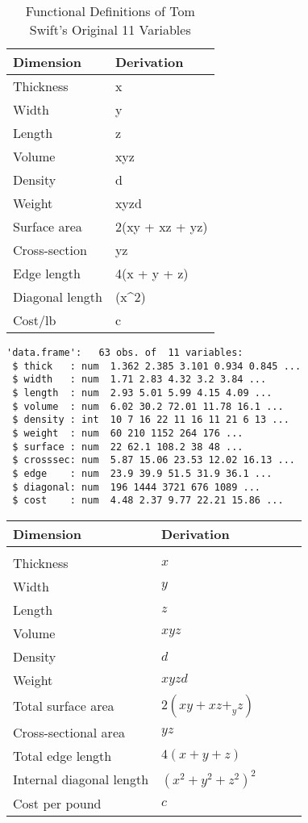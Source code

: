 \documentclass[
]{book}
\begin{document}
\begin{table}

\caption{\label{tab:unnamed-chunk-10}Functional Definitions of Tom Swift's Original 11 Variables}
\centering
\begin{tabular}[t]{l|l}
\hline
Dimension & Derivation\\
\hline
Thickness & x\\
\hline
Width & y\\
\hline
Length & z\\
\hline
Volume & xyz\\
\hline
Density & d\\
\hline
Weight & xyzd\\
\hline
Surface area & 2(xy + xz + yz)\\
\hline
Cross-section & yz\\
\hline
Edge length & 4(x + y + z)\\
\hline
Diagonal length & (x\textasciicircum{}2)\\
\hline
Cost/lb & c\\
\hline
\end{tabular}
\end{table}

\begin{verbatim}
'data.frame':   63 obs. of  11 variables:
 $ thick   : num  1.362 2.385 3.101 0.934 0.845 ...
 $ width   : num  1.71 2.83 4.32 3.2 3.84 ...
 $ length  : num  2.93 5.01 5.99 4.15 4.09 ...
 $ volume  : num  6.02 30.2 72.01 11.78 16.1 ...
 $ density : int  10 7 16 22 11 16 11 21 6 13 ...
 $ weight  : num  60 210 1152 264 176 ...
 $ surface : num  22 62.1 108.2 38 48 ...
 $ crosssec: num  5.87 15.06 23.53 12.02 16.13 ...
 $ edge    : num  23.9 39.9 51.5 31.9 36.1 ...
 $ diagonal: num  196 1444 3721 676 1089 ...
 $ cost    : num  4.48 2.37 9.77 22.21 15.86 ...
\end{verbatim}

\begin{table}[]
\begin{tabular}{lllll}
 Dimension &  Derivation  &  \\
 \hline \\
 Thickness &  $x$  \\
 Width & $y$ \\
 Length & $z$ \\
 Volume & $xyz$ \\
 Density & $d$ \\
 Weight & $xyzd$ \\
 Total surface area & $2(xy + xz +_ yz)$ \\
 Cross-sectional area & $yz$ \\
 Total edge length & $4(x +  y + z)$ \\
 Internal diagonal length & $(x^2 + y^2 + z^2)^2$ \\
 Cost per pound & $c$
\end{tabular}
\end{table}
\end{document}
